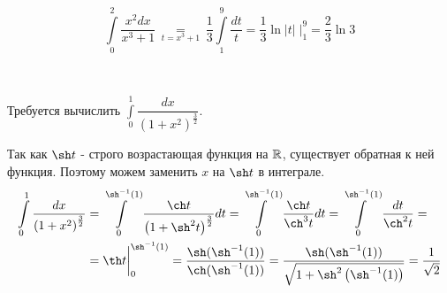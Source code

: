 \documentclass[../main.tex]{subfiles}
\begin{document}
\begin{example}
    \[ \displaystyle\int\limits_{ 0}^{ 2} \dfrac{ x^2dx}{ x^3+1} \underset{\;t=x^3+1\;}{=} \dfrac{ 1}{ 3} \displaystyle\int\limits_{ 1}^{ 9} \dfrac{ dt}{ t} = \dfrac{ 1}{ 3} \ln \left| t\right| \;\bigg|_1^9= \dfrac{ 2}{ 3} \ln 3\]
\end{example}

\begin{example}
    
    ~

    Требуется вычислить \( \displaystyle\int\limits_{ 0}^{ 1} \dfrac{ dx}{ \left( 1+x^2\right)^{ \frac{ 3}{ 2} }}\). 

    Так как \( \sh t\) - строго возрастающая функция на \( \mathbb{R} \), существует обратная к ней функция. Поэтому можем заменить \( x\) на \( \sh t\) в интеграле.  
    \begin{equation*}
        \begin{aligned}
            \displaystyle\int\limits_{ 0}^{ 1} \dfrac{ dx}{ \left( 1+x^2\right)^{ \frac{ 3}{ 2} }}&= \displaystyle\int\limits_{ 0}^{ \sh^{-1}(1)} \dfrac{ \ch t}{ \left( 1+\sh^2 t\right)^{ \frac{ 3}{ 2} }} dt=\displaystyle\int\limits_{ 0}^{ \sh^{-1}(1)} \dfrac{ \ch t}{ \ch^3 t} dt= \displaystyle\int\limits_{ 0}^{ \sh^{-1}(1)} \dfrac{ dt}{ \ch^2 t} = \\
            &=\th t \bigg|_0^{\sh^{-1}(1)}= \dfrac{ \sh(\sh^{-1}(1))}{ \ch(\sh^{-1}(1))} =\dfrac{ \sh(\sh^{-1}(1))}{ \;\sqrt[]{1+ \sh^2\left( \sh^{-1}(1)\right)}} = \dfrac{ 1}{ \;\sqrt[]{2}} 
        \end{aligned}
    \end{equation*}
\end{example}
\end{document}
